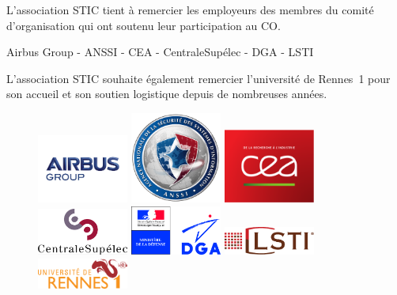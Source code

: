 \noindent
L'association STIC tient à remercier les employeurs des membres du
comité d'organisation qui ont soutenu leur participation au CO.

\begin{center}
Airbus Group - ANSSI -  CEA - CentraleSup\'elec - DGA - LSTI
\end{center}

\bigskip

\noindent
L'association STIC souhaite également remercier l'université de
Rennes~1 pour son accueil et son soutien logistique depuis de
nombreuses années.


\begin{figure}[h]
\begin{center}
\parbox{3cm}{\includegraphics[width=3cm]{_images/airbus}}
\hfill
\parbox{3cm}{\includegraphics[width=3cm]{_images/anssi}}
\hfill
\parbox{3cm}{\includegraphics[width=3cm]{_images/cea}}
\end{center}
\vfill
\begin{center}
\parbox{3cm}{\includegraphics[width=3cm]{_images/centrale-supelec}}
\hfill
\parbox{3cm}{\includegraphics[width=3cm]{_images/dga}}
\hfill
\parbox{3cm}{\includegraphics[width=3cm]{_images/lsti}}
\end{center}
\vfill
\begin{center}
\parbox{3cm}{\includegraphics[width=3cm]{_images/uni-rennes1}}
\end{center}
\end{figure}

